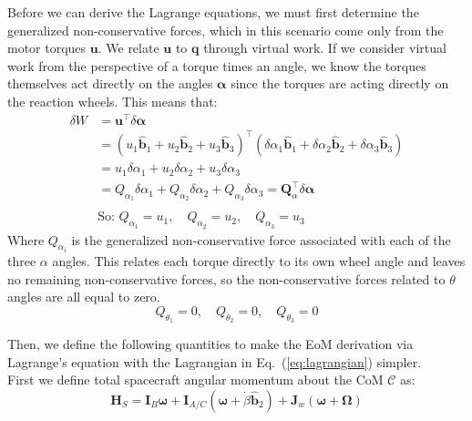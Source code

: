 \documentclass[titlepage]{article}
\begin{document}
Before we can derive the Lagrange equations, we must first determine the generalized non-conservative forces, which in this scenario come only from the motor torques $\boldsymbol{u}$. We relate $\boldsymbol{u}$ to $\boldsymbol{q}$ through virtual work. If we consider virtual work from the perspective of a torque times an angle, we know the torques themselves act directly on the angles $\boldsymbol{\alpha}$ since the torques are acting directly on the reaction wheels. This means that:
\begin{equation}
	\begin{split}
		\delta W&=\boldsymbol{u}^\top\delta\boldsymbol{\alpha} \\
		&=\left(u_1\hat{\boldsymbol{b}}_1+u_2\hat{\boldsymbol{b}}_2+u_3\hat{\boldsymbol{b}}_3\right)^\top\left(\delta\alpha_1\hat{\boldsymbol{b}}_1+\delta\alpha_2\hat{\boldsymbol{b}}_2+\delta\alpha_3\hat{\boldsymbol{b}}_3\right) \\
		&= u_1\delta\alpha_1+u_2\delta\alpha_2+u_3\delta\alpha_3 \\
		&=Q_{\alpha_1}\delta\alpha_1 + Q_{\alpha_2}\delta\alpha_2 + Q_{\alpha_3}\delta\alpha_3=\boldsymbol{Q}_\alpha^\top\delta\boldsymbol{\alpha}\\
		\\
		&\text{So: }Q_{\alpha_1}=u_1,\quad Q_{\alpha_2}=u_2,\quad Q_{\alpha_3}=u_3
	\end{split}
\end{equation}
Where $Q_{\alpha_i}$ is the generalized non-conservative force associated with each of the three $\alpha$ angles. This relates each torque directly to its own wheel angle and leaves no remaining non-conservative forces, so the non-conservative forces related to $\theta$ angles are all equal to zero.
\begin{equation}
	Q_{\theta_1}=0,\quad Q_{\theta_2}=0,\quad Q_{\theta_3}=0
\end{equation}

Then, we define the following quantities to make the EoM derivation via Lagrange's equation with the Lagrangian in Eq.~(\ref{eq:lagrangian}) simpler.\\

First we define total spacecraft angular momentum about the CoM $\mathcal{C}$ as:
\begin{equation}
	\boldsymbol{H}_S=\boldsymbol{I}_B\boldsymbol{\omega}+\boldsymbol{I}_{A/C}\left(\boldsymbol{\omega}+\dot{\beta}\hat{\boldsymbol{b}}_2\right)+\boldsymbol{J}_w\left(\boldsymbol{\omega}+\boldsymbol{\Omega}\right)
\end{equation}
\end{document}
